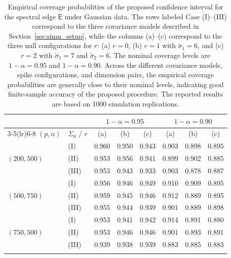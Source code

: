 \documentclass[12pt]{article}
\theoremstyle{plain}
\numberwithin{equation}{section}
\begin{document}
\begin{table}[ht]
	\centering
	\begingroup
	\footnotesize
	\setlength{\tabcolsep}{5pt}
	\renewcommand{\arraystretch}{1.0}
	\begin{tabular}{llcccccc}
		\toprule
		& & \multicolumn{3}{c}{$1-\alpha=0.95$} & \multicolumn{3}{c}{$1-\alpha=0.90$} \\
		\cmidrule(lr){3-5}\cmidrule(lr){6-8}
		$(p,n)$ & $\Sigma_0$ / $r$ & (a) & (b) & (c) & (a) & (b) & (c) \\
		\midrule
		\multirow{3}{*}{$(200,500)$}
		& (I)   & 0.960 & 0.950 & 0.943 & 0.903 & 0.898 & 0.895 \\
		& (II)  & 0.953 & 0.956 & 0.941 & 0.899 & 0.902 & 0.885 \\
		& (III) & 0.953 & 0.943 & 0.933 & 0.903 & 0.878 & 0.887 \\
		\midrule
		\multirow{3}{*}{$(500,750)$}
		&  (I)   & 0.956 & 0.946 & 0.949 & 0.910 & 0.909 & 0.895 \\
		&  (II)  & 0.959 & 0.945 & 0.946 & 0.912 & 0.889 & 0.895 \\
		&  (III) & 0.955 & 0.944 & 0.939 & 0.901 & 0.889 & 0.898 \\
		\midrule
		\multirow{3}{*}{$(750,500)$}
		&  (I)   & 0.953 & 0.941 & 0.942 & 0.914 & 0.891 & 0.880 \\
		&  (II)  & 0.953 & 0.946 & 0.946 & 0.901 & 0.893 & 0.891 \\
		&  (III) & 0.939 & 0.938 & 0.939 & 0.883 & 0.885 & 0.883 \\
		\bottomrule
		\vspace{0.2pt}
	\end{tabular}
	\endgroup
	\caption{Empirical coverage probabilities of the proposed confidence interval for the spectral edge $\mathsf E$ under Gaussian data. The rows labeled Case (I)--(III) correspond to the three covariance models described in Section~\ref{sec:simu_setup}, while the columns (a)--(c) correspond to the three null configurations for $r$: (a) $r=0$, (b) $r=1$ with $\widetilde{\sigma}_1=6$, and (c) $r=2$ with $\widetilde{\sigma}_1=7$ and $\widetilde{\sigma}_2=6$. The nominal coverage levels are $1-\alpha=0.95$ and $1-\alpha=0.90$. Across the different covariance models, spike configurations, and dimension pairs, the empirical coverage probabilities are generally close to their nominal levels, indicating good finite-sample accuracy of the proposed procedure. The reported results are based on 1000 simulation replications.}
	\label{tab:coverage_gaussian}
\end{table}
\end{document}
